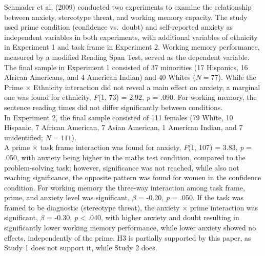 \documentclass[
  stu, a4paper,floatsintext]{apa7}
\begin{document}
Schmader et al. (2009) conducted two experiments to examine the relationship between anxiety, stereotype threat, and working memory capacity.
The study used prime condition (confidence vs.~doubt) and self-reported anxiety as independent variables in both experiments, with additional variables of ethnicity in Experiment 1 and task frame in Experiment 2.
Working memory performance, measured by a modified Reading Span Test, served as the dependent variable.
The final sample in Experiment 1 consisted of 37 minorities (17 Hispanics, 16 African Americans, and 4 American Indian) and 40 Whites (\(N = 77\)).
While the Prime \(\times\) Ethnicity interaction did not reveal a main effect on anxiety, a marginal one was found for ethnicity, \emph{F}(1, 73) = 2.92, \emph{p} = .090.
For working memory, the sentence reading times did not differ significantly between conditions.\\
In Experiment 2, the final sample consisted of 111 females (79 White, 10 Hispanic, 7 African American, 7 Asian American, 1 American Indian, and 7 unidentified; \(N = 111\)).\\
A prime \(\times\) task frame interaction was found for anxiety, \emph{F}(1, 107) = 3.83, \emph{p} = .050, with anxiety being higher in the maths test condition, compared to the problem-solving task; however, significance was not reached, while also not reaching significance, the opposite pattern was found for women in the confidence condition.
For working memory the three-way interaction among task frame, prime, and anxiety level was significant, \(\beta\) = -0.20, \emph{p} = .050.
If the task was framed to be diagnostic (stereotype threat), the anxiety \(\times\) prime interaction was significant, \(\beta\) = -0.30, \emph{p} \textless{} .040, with higher anxiety and doubt resulting in significantly lower working memory performance, while lower anxiety showed no effects, independently of the prime.
H3 is partially supported by this paper, as Study 1 does not support it, while Study 2 does.
\end{document}
